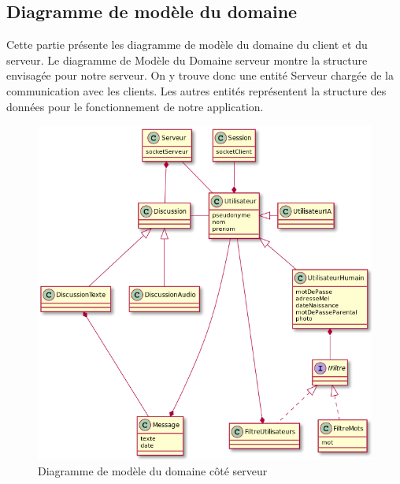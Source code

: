 \documentclass[a4paper,12pt]{article}
\begin{document}
	\subsection{Diagramme de modèle du domaine}
	Cette partie présente les diagramme de modèle du domaine du client et du serveur.
	Le diagramme de Modèle du Domaine serveur montre la structure envisagée pour notre serveur.
	On y trouve donc une entité Serveur chargée de la communication avec les clients.
	Les autres entités représentent la structure des données pour le fonctionnement de notre application.

	\begin{figure}[H]
		\centerline{\includegraphics[width=16.5cm]{../diagrammes/img/modeleDomaineServeur.png}}
		\caption{Diagramme de modèle du domaine côté serveur}
	\end{figure}

	\newpage
\end{document}
